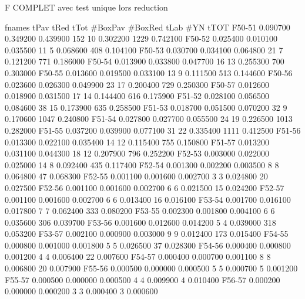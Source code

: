 F COMPLET avec test unique lors reduction

      fnames         tPav         tRed         tTot    #BoxPav    #BoxRed         tLab        #YN         tTOT
      F50-51     0.090700     0.349200     0.439900        152         10     0.302200       1229     0.742100
      F50-52     0.025400     0.010100     0.035500         11          5     0.068600        408     0.104100
      F50-53     0.030700     0.034100     0.064800         21          7     0.121200        771     0.186000
      F50-54     0.013900     0.033800     0.047700         16         13     0.255300        700     0.303000
      F50-55     0.013600     0.019500     0.033100         13          9     0.111500        513     0.144600
      F50-56     0.023600     0.026300     0.049900         23         17     0.200400        729     0.250300
      F50-57     0.012600     0.018900     0.031500         17         14     0.144400        616     0.175900
      F51-52     0.028100     0.056500     0.084600         38         15     0.173900        635     0.258500
      F51-53     0.018700     0.051500     0.070200         32          9     0.170600       1047     0.240800
      F51-54     0.027800     0.027700     0.055500         24         19     0.226500       1013     0.282000
      F51-55     0.037200     0.039900     0.077100         31         22     0.335400       1111     0.412500
      F51-56     0.013300     0.022100     0.035400         14         12     0.115400        755     0.150800
      F51-57     0.013200     0.031100     0.044300         18         12     0.207900        796     0.252200
      F52-53     0.003000     0.022000     0.025000         14          8     0.092400        435     0.117400
      F52-54     0.001300     0.002200     0.003500          8          8     0.064800         47     0.068300
      F52-55     0.001100     0.001600     0.002700          3          3     0.024800         20     0.027500
      F52-56     0.001100     0.001600     0.002700          6          6     0.021500         15     0.024200
      F52-57     0.001100     0.001600     0.002700          6          6     0.013400         16     0.016100
      F53-54     0.001700     0.016100     0.017800          7          7     0.062400        333     0.080200
      F53-55     0.002300     0.001800     0.004100          6          6     0.035600        306     0.039700
      F53-56     0.001600     0.012600     0.014200          5          4     0.039000        318     0.053200
      F53-57     0.002100     0.000900     0.003000          9          9     0.012400        173     0.015400
      F54-55     0.000800     0.001000     0.001800          5          5     0.026500         37     0.028300
      F54-56     0.000400     0.000800     0.001200          4          4     0.006400         22     0.007600
      F54-57     0.000400     0.000700     0.001100          8          8     0.006800         20     0.007900
      F55-56     0.000500     0.000000     0.000500          5          5     0.000700          5     0.001200
      F55-57     0.000500     0.000000     0.000500          4          4     0.009900          4     0.010400
      F56-57     0.000200     0.000000     0.000200          3          3     0.000400          3     0.000600



